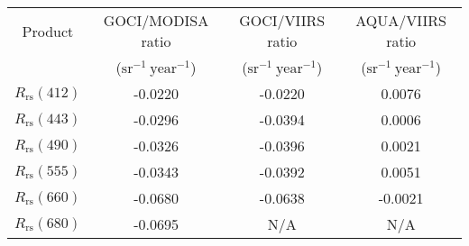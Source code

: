 \documentclass[preview]{standalone}
\begin{document}
\begin{threeparttable}

\centering
\begin{tabular}{cccc} 
 \hline 

Product & GOCI/MODISA ratio & GOCI/VIIRS ratio & AQUA/VIIRS ratio \\ 
& ($\text{sr}^{-1}~\text{year}^{-1}$)	& ($\text{sr}^{-1}~\text{year}^{-1}$)	& ($\text{sr}^{-1}~\text{year}^{-1}$) 	\\ \hline
$R_\text{rs}(412)$ & -0.0220 & -0.0220 & 0.0076 \\
$R_\text{rs}(443)$ & -0.0296 & -0.0394 & 0.0006 \\
$R_\text{rs}(490)$ & -0.0326 & -0.0396 & 0.0021 \\
$R_\text{rs}(555)$ & -0.0343 & -0.0392 & 0.0051 \\
$R_\text{rs}(660)$ & -0.0680 & -0.0638 &-0.0021\\
$R_\text{rs}(680)$ & -0.0695 & N/A 				& N/A 				\\


\hline 
\end{tabular}

\end{threeparttable}
\end{document}
